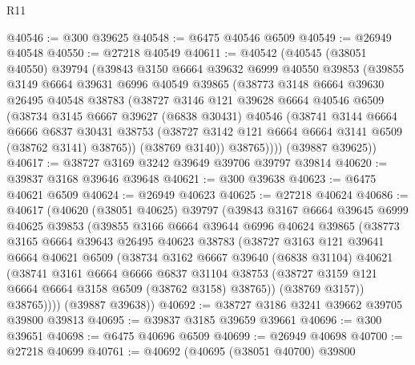 \begin{lexlean}{R11}
\begin{coremodule}
@40546 := @300 @39625
@40548 := @6475 @40546 @6509
@40549 := @26949 @40548
@40550 := @27218 @40549
@40611 := @40542
    (@40545
      (@38051 @40550)
      @39794
      (@39843
        @3150
        @6664
        @39632
        @6999
        @40550
        @39853
        (@39855
          @3149
          @6664
          @39631
          @6996
          @40549
          @39865
          (@38773
            @3148
            @6664
            @39630
            @26495
            @40548
            @38783
            (@38727
              @3146
              @121
              @39628
              @6664
              @40546
              @6509
              (@38734
                @3145
                @6667
                @39627
                (@6838 @30431)
                @40546
                (@38741
                  @3144
                  @6664
                  @6666
                  @6837
                  @30431
                  @38753
                  (@38727 @3142 @121 @6664 @6664 @3141 @6509 (@38762 @3141) @38765))
                (@38769 @3140))
              @38765))))
      (@39887 @39625))
@40617 := @38727 @3169 @3242 @39649 @39706 @39797 @39814
@40620 := @39837 @3168 @39646 @39648
@40621 := @300 @39638
@40623 := @6475 @40621 @6509
@40624 := @26949 @40623
@40625 := @27218 @40624
@40686 := @40617
    (@40620
      (@38051 @40625)
      @39797
      (@39843
        @3167
        @6664
        @39645
        @6999
        @40625
        @39853
        (@39855
          @3166
          @6664
          @39644
          @6996
          @40624
          @39865
          (@38773
            @3165
            @6664
            @39643
            @26495
            @40623
            @38783
            (@38727
              @3163
              @121
              @39641
              @6664
              @40621
              @6509
              (@38734
                @3162
                @6667
                @39640
                (@6838 @31104)
                @40621
                (@38741
                  @3161
                  @6664
                  @6666
                  @6837
                  @31104
                  @38753
                  (@38727 @3159 @121 @6664 @6664 @3158 @6509 (@38762 @3158) @38765))
                (@38769 @3157))
              @38765))))
      (@39887 @39638))
@40692 := @38727 @3186 @3241 @39662 @39705 @39800 @39813
@40695 := @39837 @3185 @39659 @39661
@40696 := @300 @39651
@40698 := @6475 @40696 @6509
@40699 := @26949 @40698
@40700 := @27218 @40699
@40761 := @40692
    (@40695
      (@38051 @40700)
      @39800

\end{coremodule}
\end{lexlean}
